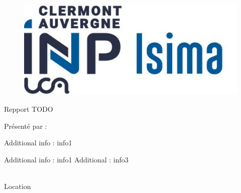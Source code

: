 
\begin{titlepage}
  \rmfamily{}

  \begin{figure}
    \centering
    \includegraphics[width=0.7\linewidth]{logos/isima.jpeg}
    \label{fig:ISIMA}
  \end{figure}

  \begin{center}
    \begin{Large}
      Repport TODO\\
      \vspace{0.3cm}
      \textbf{\paperTitle}
    \end{Large}

    \vspace{3cm}
    \begin{large}
      Présenté par : \authorName\\
    \end{large}
  \end{center}

  \vspace{4cm}
  Additional info : info1\par
  Additional info : info1 \hfill Additional : info3\\\\

  \begin{center}
    \begin{small}
      Location\par
    \end{small}
  \end{center}
\end{titlepage}
